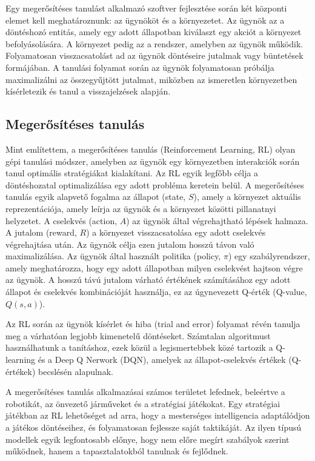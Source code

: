 \documentclass[
]{thesis-ekf}
\theoremstyle{definition}
\theoremstyle{remark}
\begin{document}
Egy megerősítéses tanulást alkalmazó szoftver fejlesztése során két központi elemet kell meghatároznunk: az ügynököt és a környezetet. Az ügynök az a döntéshozó entitás, amely egy adott állapotban kiválaszt egy akciót a környezet befolyásolására. A környezet pedig az a rendszer, amelyben az ügynök működik. Folyamatosan visszacsatolást ad az ügynök döntéseire jutalmak vagy büntetések formájában. A tanulási folyamat során az ügynök folyamatosan próbálja maximalizálni az összegyűjtött jutalmat, miközben az ismeretlen környezetben kísérletezik és tanul a visszajelzések alapján.

\subsection{Megerősítéses tanulás}

Mint említettem, a megerősítéses tanulás (Reinforcement Learning, RL) olyan gépi tanulási módszer, amelyben az ügynök egy környezetben interakciók során tanul optimális stratégiákat kialakítani. Az RL egyik legfőbb célja a döntéshozatal optimalizálása egy adott probléma keretein belül. \cite{RL} A megerősítéses tanulás egyik alapvető fogalma az állapot (state, $S$), amely a környezet aktuális reprezentációja, amely leírja az ügynök és a környezet közötti pillanatnyi helyzetet. A cselekvés (action, $A$) az ügynök által végrehajtható lépések halmaza. A jutalom (reward, $R$) a környezet visszacsatolása egy adott cselekvés végrehajtása után. Az ügynök célja ezen jutalom hosszú távon való maximalizálása. Az ügynök által használt politika (policy, $\pi$) egy szabályrendszer, amely meghatározza, hogy egy adott állapotban milyen cselekvést hajtson végre az ügynök. A hosszú távú jutalom várható értékének számításához egy adott állapot és cselekvés kombinációját használja, ez az úgynevezett Q-érték (Q-value, $Q(s,a)$).

Az RL során az ügynök kísérlet és hiba (trial and error) folyamat révén tanulja meg a várhatóan legjobb kimenetelű döntéseket. Számtalan algoritmust használhatunk a tanításhoz, ezek közül a legismertebbek közé tartozik a Q-learning és a Deep Q Nerwork (DQN), amelyek az állapot-cselekvés értékek (Q-értékek) becslésén alapulnak.

A megerősítéses tanulás alkalmazásai számos területet lefednek, beleértve a robotikát, az önvezető járműveket és a stratégiai játékokat. Egy stratégiai játékban az RL lehetőséget ad arra, hogy a mesterséges intelligencia adaptálódjon a játékos döntéseihez, és folyamatosan fejlessze saját taktikáját. Az ilyen típusú modellek egyik legfontosabb előnye, hogy nem előre megírt szabályok szerint működnek, hanem a tapasztalatokból tanulnak és fejlődnek.
\end{document}
